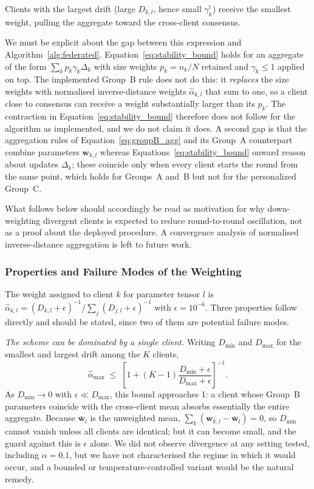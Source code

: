 \documentclass[utf8]{FrontiersinHarvard} %
\begin{document}
Clients with the largest drift (large $D_{k,l}$, hence small $\gamma_k^t$) receive the smallest weight, pulling the aggregate toward the cross-client consensus.

We must be explicit about the gap between this expression and Algorithm~\ref{alg:federated}. Equation~\eqref{eq:stability_bound} holds for an aggregate of the form $\sum_k p_k \gamma_k \Delta_k$ with size weights $p_k = n_k/N$ retained and $\gamma_k \le 1$ applied on top. The implemented Group~B rule does not do this: it \emph{replaces} the size weights with normalised inverse-distance weights $\hat{\alpha}_{k,l}$ that sum to one, so a client close to consensus can receive a weight substantially larger than its $p_k$. The contraction in Equation~\eqref{eq:stability_bound} therefore does not follow for the algorithm as implemented, and we do not claim it does. A second gap is that the aggregation rules of Equation~\eqref{eq:groupB_agg} and its Group~A counterpart combine parameters $\mathbf{w}_{k,l}$ whereas Equations~\eqref{eq:stability_bound} onward reason about updates $\Delta_k$; these coincide only when every client starts the round from the same point, which holds for Groups~A and~B but not for the personalized Group~C.

What follows below should accordingly be read as motivation for why down-weighting divergent clients is expected to reduce round-to-round oscillation, not as a proof about the deployed procedure. A convergence analysis of normalised inverse-distance aggregation is left to future work.

\subsubsection{Properties and Failure Modes of the Weighting}
\label{sec:weight_analysis}

The weight assigned to client $k$ for parameter tensor $l$ is
$\hat{\alpha}_{k,l} = (D_{k,l}+\epsilon)^{-1} / \sum_j (D_{j,l}+\epsilon)^{-1}$
with $\epsilon = 10^{-6}$. Three properties follow directly and should be stated, since two of them are potential failure modes.

\emph{The scheme can be dominated by a single client.} Writing $D_{\min}$ and $D_{\max}$ for the smallest and largest drift among the $K$ clients,
\begin{equation}
\hat{\alpha}_{\max} \;\le\; \left[1 + (K-1)\frac{D_{\min}+\epsilon}{D_{\max}+\epsilon}\right]^{-1} .
\end{equation}
As $D_{\min} \to 0$ with $\epsilon \ll D_{\max}$, this bound approaches 1: a client whose Group~B parameters coincide with the cross-client mean absorbs essentially the entire aggregate. Because $\bar{\mathbf{w}}_l$ is the unweighted mean, $\sum_k (\mathbf{w}_{k,l} - \bar{\mathbf{w}}_l) = 0$, so $D_{\min}$ cannot vanish unless all clients are identical; but it can become small, and the guard against this is $\epsilon$ alone. We did not observe divergence at any setting tested, including $\alpha{=}0.1$, but we have not characterised the regime in which it would occur, and a bounded or temperature-controlled variant would be the natural remedy.
\end{document}
